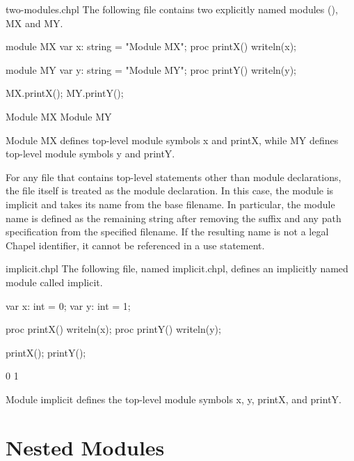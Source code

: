 \begin{chapelexample}{two-modules.chpl}
The following file contains two explicitly named modules
(), MX and MY.
\begin{chapel}
module MX {
  var x: string = "Module MX";
  proc printX() {
    writeln(x);
  }
}

module MY {
  var y: string = "Module MY";
  proc printY() {
    writeln(y);
  }
}
\end{chapel}
\begin{chapelpost}
MX.printX();
MY.printY();
\end{chapelpost}
\begin{chapeloutput}
Module MX
Module MY
\end{chapeloutput}
Module MX defines top-level module symbols x and printX, while MY
defines top-level module symbols y and printY.
\end{chapelexample}

For any file that contains top-level statements other than module
declarations, the file itself is treated as the module declaration.
In this case,
the module is implicit and takes its name from the base filename.  In
particular, the module name is defined as the remaining string after
removing the  suffix and any path specification from the
specified filename.  If the resulting name is not a legal Chapel
identifier, it cannot be referenced in a use statement.

\begin{chapelexample}{implicit.chpl}
The following file, named implicit.chpl, defines an implicitly named
module called implicit.
\begin{chapel}
var x: int = 0;
var y: int = 1;

proc printX() {
  writeln(x);
}
proc printY() {
  writeln(y);
}
\end{chapel}
\begin{chapelpost}
printX();
printY();
\end{chapelpost}
\begin{chapeloutput}
0
1
\end{chapeloutput}
Module implicit defines the top-level module symbols x, y, printX, and
printY.
\end{chapelexample}


\section{Nested Modules}
\label{Nested_Modules}

